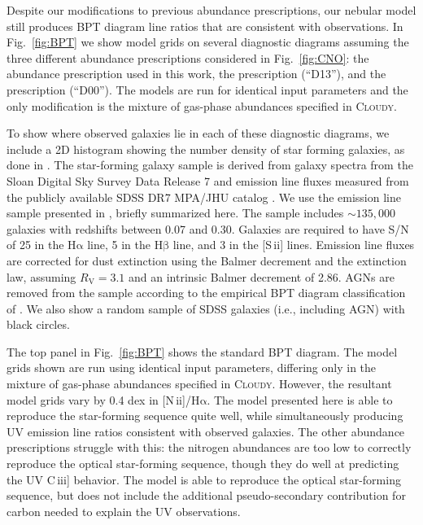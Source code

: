 \documentclass[preprint2,trackchanges]{aastex62}
\newcommand{\Cloudy}{\textsc{Cloudy}\xspace}
\newcommand{\nii}{[N\,{\sc ii}]\xspace}
\newcommand{\sii}{[S\,{\sc ii}]\xspace}
\newcommand{\ciii}{C\,{\sc iii}]\xspace}
\newcommand{\ha}{\ensuremath{\mathrm{H\alpha}}\xspace}
\newcommand{\hb}{\ensuremath{\mathrm{H\beta}}\xspace}
\begin{document}
Despite our modifications to previous abundance prescriptions, our nebular model still produces BPT diagram line ratios that are consistent with observations. In Fig.~\ref{fig:BPT} we show model grids on several diagnostic diagrams assuming the three different abundance prescriptions considered in Fig.~\ref{fig:CNO}: the abundance prescription used in this work, the \citet{Dopita+2013} prescription (``D13''), and the \citet{Dopita+2000} prescription (``D00''). The models are run for identical input parameters and the only modification is the mixture of gas-phase abundances specified in \Cloudy.

To show where observed galaxies lie in each of these diagnostic diagrams, we include a 2D histogram showing the number density of star forming galaxies, as done in \citet{Byler+2017}. The star-forming galaxy sample is derived from galaxy spectra from the Sloan Digital Sky Survey Data Release 7 \citep[SDSS DR7;][]{York+2000, Abazajian+2009} and emission line fluxes measured from the publicly available SDSS DR7 MPA/JHU catalog \citep{Kauffmann+2003a, Brinchmann+2004, Salim+2007}. We use the emission line sample presented in \citet{Telford+2016}, briefly summarized here. The sample includes $\sim 135,000$ galaxies with redshifts between 0.07 and 0.30. Galaxies are required to have S/N of 25 in the \ha{} line, 5 in the \hb{} line, and 3 in the \sii{} lines. Emission line fluxes are corrected for dust extinction using the Balmer decrement and the \citet{Cardelli+1989} extinction law, assuming $R_{\mathrm{V}} = 3.1$ and an intrinsic Balmer decrement of 2.86. AGNs are removed from the sample according to the empirical BPT diagram classification of \citet{Kauffmann+2003b}. We also show a random sample of SDSS galaxies (i.e., including AGN) with black circles.

The top panel in Fig.~\ref{fig:BPT} shows the standard BPT diagram. The model grids shown are run using identical input parameters, differing only in the mixture of gas-phase abundances specified in \Cloudy. However, the resultant model grids vary by 0.4 dex in \nii/\ha. The model presented here is able to reproduce the star-forming sequence quite well, while simultaneously producing UV emission line ratios consistent with observed galaxies. The other abundance prescriptions struggle with this: the \citet{Dopita+2013} nitrogen abundances are too low to correctly reproduce the optical star-forming sequence, though they do well at predicting the UV \ciii behavior. The \citet{Dopita+2000} model is able to reproduce the optical star-forming sequence, but does not include the additional pseudo-secondary contribution for carbon needed to explain the UV observations.
\end{document}
